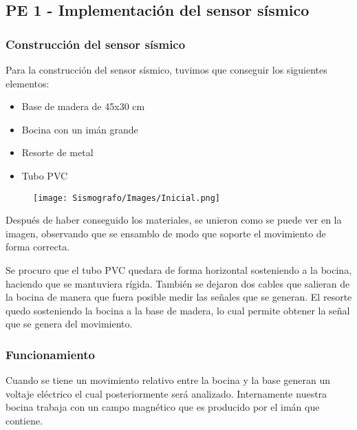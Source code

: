 \documentclass[12pt]{article}
\begin{document}
	    \subsection{PE 1 - Implementación del sensor sísmico}
	        
	        \subsubsection{Construcción del sensor sísmico}
	        
	        Para la construcción del sensor sísmico, tuvimos que conseguir los siguientes elementos:
	        \begin{multicols}{2}
    	        \begin{itemize}
    	            \item Base de madera de 45x30 cm
    	            \item Bocina con un imán grande 
    	    \columnbreak
    	            \item Resorte de metal
    	            \item Tubo PVC
    	        \end{itemize}
	        \end{multicols}
	       
	        \begin{wrapfigure}{l}{0.50\textwidth}
             \texttt{[image: Sismografo/Images/Inicial.png]}
            \end{wrapfigure}
            
            Después de haber conseguido los materiales, se unieron como se puede ver en la imagen, observando que se ensamblo de modo que soporte el movimiento de forma correcta.
	        
            Se procuro que el tubo PVC quedara de forma horizontal sosteniendo a la bocina, haciendo que se mantuviera rígida. También se dejaron dos cables que salieran de la bocina de manera que fuera posible medir las señales que se generan. El resorte quedo sosteniendo la bocina a la base de madera, lo cual permite obtener la señal que se genera del movimiento.

             \subsubsection{Funcionamiento}
	        Cuando se tiene un movimiento relativo entre la bocina y la base generan un voltaje eléctrico el cual posteriormente será analizado. Internamente nuestra bocina trabaja con un campo magnético que es producido por el imán que contiene.
\end{document}
